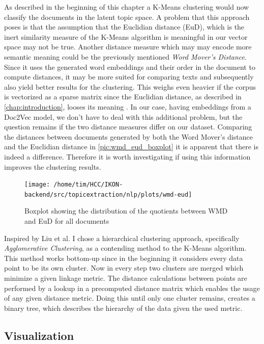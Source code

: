As described in the beginning of this chapter a K-Means clustering would now classify the documents in the latent topic space. A problem that this approach poses is that the assumption that the Euclidian distance (EuD), which is the inert similarity measure of the K-Means algorithm is meaningful in our vector space may not be true. Another distance measure which may may encode more semantic meaning could be the previously mentioned \textit{Word Mover's Distance}. Since it uses the generated word embeddings and their order in the document to compute distances, it may be more suited for comparing texts and subsequently also yield better results for the clustering. This weighs even heavier if the corpus is vectorized as a sparse matrix since the Euclidian distance, as described in \autoref{chap:introduction}, looses its meaning . In our case, having embeddings from a Doc2Vec model, we don't have to deal with this additional problem, but the question remains if the two distance measures differ on our dataset.  
Comparing the distances between documents generated by both the Word Mover's distance and the Euclidian distance in \autoref{pic:wmd_eud_boxplot} it is apparent that there is indeed a difference. Therefore it is worth investigating if using this information improves the clustering results. 

\begin{figure}[t]
	\centering
	\texttt{[image: /home/tim/HCC/IKON-backend/src/topicextraction/nlp/plots/wmd-eud]}
	\caption{\label{pic:wmd_eud_boxplot} Boxplot showing the distribution of the quotients between WMD and EuD for all documents}
\end{figure}

Inspired by Liu et al. \cite{Liu:2018:INE:3219819.3220001} I chose a hierarchical clustering approach, specifically \textit{Agglomerative Clustering}, as a contending method to the K-Means algorithm. This method works bottom-up since in the beginning it considers every data point to be its own cluster. Now in every step two clusters are merged which minimize a given linkage metric. The distance calculations between points are performed by a lookup in a precomputed distance matrix which enables the usage of any given distance metric. Doing this until only one cluster remains, creates a binary tree, which describes the hierarchy of the data given the used metric. 

\subsection{Visualization}

